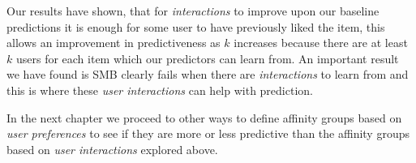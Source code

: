 Our results have shown, that for \emph{interactions} to improve upon our baseline predictions it is enough for some user to 
have previously liked the item, this allows an improvement in predictiveness as $k$ increases because there are at least $k$ users for each item
which our predictors can learn from. An important result we have found is SMB clearly fails when there are \emph{interactions} to learn from and 
this is where these \emph{user interactions} can help with prediction.

In the next chapter we proceed to other ways to define affinity groups based on \emph{user preferences} 
to see if they are more or less predictive than the affinity groups based on \emph{user interactions} explored above.

